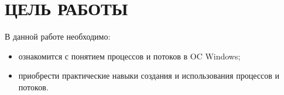 \section{ЦЕЛЬ РАБОТЫ}

В данной работе необходимо:

\begin{itemize}
  \item ознакомится с понятием процессов и потоков в OC Windows;
  \item приобрести практические навыки создания и использования процессов и потоков.
\end{itemize}

\newpage

